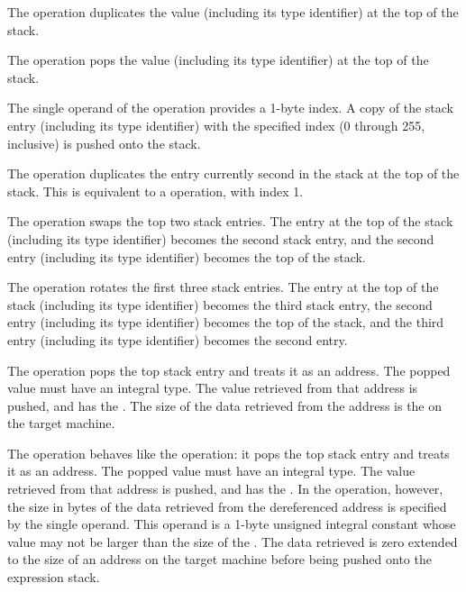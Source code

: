 \begin{enumerate}[1. ]
\itembfnl{\DWOPdupTARG}
The \DWOPdupNAME{} operation duplicates the value (including its 
type identifier) at the top of the stack.

\itembfnl{\DWOPdropTARG}
The \DWOPdropNAME{} operation pops the value (including its type 
identifier) at the top of the stack.

\itembfnl{\DWOPpickTARG}
The single operand of the \DWOPpickNAME{} operation provides a
1-byte index. A copy of the stack entry (including its 
type identifier) with the specified
index (0 through 255, inclusive) is pushed onto the stack.

\itembfnl{\DWOPoverTARG}
The \DWOPoverNAME{} operation duplicates the entry currently second
in the stack at the top of the stack. 
This is equivalent to a
\DWOPpick{} operation, with index 1.  

\itembfnl{\DWOPswapTARG}
The \DWOPswapNAME{} operation swaps the top two stack entries. 
The entry at the top of the stack (including its type identifier)
becomes the second stack entry, and the second entry (including 
its type identifier) becomes the top of the stack.

\itembfnl{\DWOProtTARG}
The \DWOProtNAME{} operation rotates the first three stack
entries. The entry at the top of the stack (including its 
type identifier) becomes the third stack entry, the second 
entry (including its type identifier) becomes the top of 
the stack, and the third entry (including its type identifier)
becomes the second entry.

\itembfnl{\DWOPderefTARG}
The \DWOPderefNAME{} operation pops the top stack entry and 
treats it as an address. The popped value must have an integral type.
The value retrieved from that address is pushed, 
\bb
and has the \specialaddresstype{}.
\eb 
The size of the data retrieved from the 
address is the  on the target machine.

\itembfnl{\DWOPderefsizeTARG}
The \DWOPderefsizeNAME{} operation behaves like the 
\DWOPderef{}
operation: it pops the top stack entry and treats it as an
address. The popped value must have an integral type.
The value retrieved from that address is pushed,
\bb
and has the \specialaddresstype{}.
\eb 
In the \DWOPderefsizeNAME{} operation, however, the size in bytes
of the data retrieved from the dereferenced address is
specified by the single operand. This operand is a 1-byte
unsigned integral constant whose value may not be larger
than the size of the \specialaddresstype. The data
retrieved is zero extended to the size of an address on the
target machine before being pushed onto the expression stack.


\end{enumerate}
